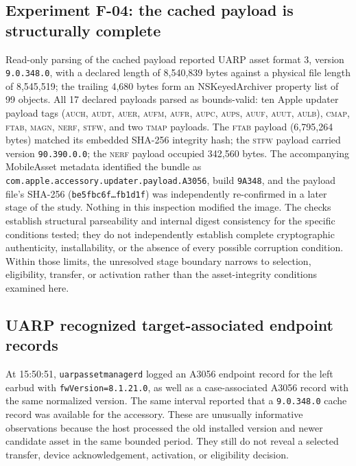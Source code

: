\documentclass[11pt,letterpaper]{article}
\begin{document}
\subsection{Experiment F-04: the cached payload is structurally complete}
Read-only parsing of the cached payload reported UARP asset format 3, version \texttt{9.0.348.0}, with a declared length of 8,540,839 bytes against a physical file length of 8,545,519; the trailing 4,680 bytes form an NSKeyedArchiver property list of 99 objects. All 17 declared payloads parsed as bounds-valid: ten Apple updater payload tags (\textsc{auch}, \textsc{audt}, \textsc{auer}, \textsc{aufm}, \textsc{aufr}, \textsc{aupc}, \textsc{aups}, \textsc{auuf}, \textsc{auut}, \textsc{aulb}), \textsc{cmap}, \textsc{ftab}, \textsc{magn}, \textsc{nerf}, \textsc{stfw}, and two \textsc{tmap} payloads. The \textsc{ftab} payload (6,795,264 bytes) matched its embedded SHA-256 integrity hash; the \textsc{stfw} payload carried version \texttt{90.390.0.0}; the \textsc{nerf} payload occupied 342,560 bytes. The accompanying MobileAsset metadata identified the bundle as \texttt{com.apple.accessory.updater.payload.A3056}, build \texttt{9A348}, and the payload file's SHA-256 (\texttt{be5fbc6f\ldots fb1d1f}) was independently re-confirmed in a later stage of the study. Nothing in this inspection modified the image. The checks establish structural parseability and internal digest consistency for the specific conditions tested; they do not independently establish complete cryptographic authenticity, installability, or the absence of every possible corruption condition. Within those limits, the unresolved stage boundary narrows to selection, eligibility, transfer, or activation rather than the asset-integrity conditions examined here.

\subsection{UARP recognized target-associated endpoint records}
At 15:50:51, \texttt{uarpassetmanagerd} logged an A3056 endpoint record for the left earbud with \texttt{fwVersion=8.1.21.0}, as well as a case-associated A3056 record with the same normalized version. The same interval reported that a \texttt{9.0.348.0} cache record was available for the accessory. These are unusually informative observations because the host processed the old installed version and newer candidate asset in the same bounded period. They still do not reveal a selected transfer, device acknowledgement, activation, or eligibility decision.
\end{document}
